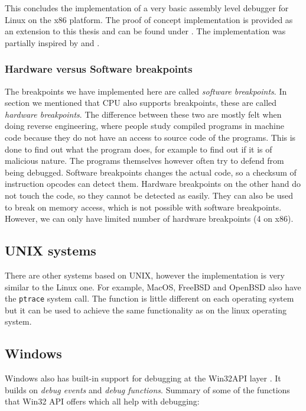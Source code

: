 This concludes the implementation of a very basic assembly level debugger for
Linux on the x86 platform. The proof of concept implementation is provided as
an extension to this thesis and can be found under . The implementation was partially inspired by
\cite{linux-debugger-blog} and \cite{lldb}.

\subsubsection*{Hardware versus Software breakpoints}
The breakpoints we have implemented here are called \textit{software
breakpoints}. In section  we mentioned that CPU also supports
breakpoints, these are called \textit{hardware breakpoints}. The difference
between these two are mostly felt when doing reverse engineering, where people
study compiled programs in machine code because they do not have an access to
source code of the programs. This is done to find out what the program does,
for example to find out if it is of malicious nature. The programs themselves
however often try to defend from being debugged. Software breakpoints changes
the actual code, so a checksum of instruction opcodes can detect them. Hardware
breakpoints on the other hand do not touch the code, so they cannot be detected
as easily. They can also be used to break on memory access, which is not
possible with software breakpoints. However, we can only have limited number of
hardware breakpoints (4 on x86).


\subsection{UNIX systems}
There are other systems based on UNIX, however the implementation is very similar to the Linux one.
For example, MacOS, FreeBSD and OpenBSD also have the \texttt{ptrace} system call. The function is
little different on each operating system but it can be used to achieve the same functionality as
on the linux operating system.

\subsection{Windows}
Windows also has built-in support for debugging at the Win32API layer
\cite{windows-msdn-debugging-api, windows-press-debugging-api}. It builds on
\textit{debug events} and \textit{debug functions}. Summary of some of the
functions that Win32 API offers which all help with debugging:

